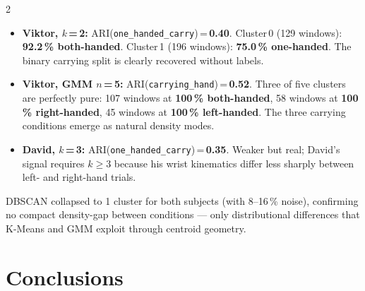 \documentclass[10pt,a4paper]{article}
\begin{document}
\begin{multicols}{2}
\begin{itemize}
  \item \textbf{Viktor, $k$\,=\,2:}
        ARI(\texttt{one\_handed\_carry})\,=\,\textbf{0.40}.
        Cluster\,0 (129 windows): \textbf{92.2\,\% both-handed}.
        Cluster\,1 (196 windows): \textbf{75.0\,\% one-handed}.
        The binary carrying split is clearly recovered without labels.
  \item \textbf{Viktor, GMM $n$\,=\,5:}
        ARI(\texttt{carrying\_hand})\,=\,\textbf{0.52}.
        Three of five clusters are perfectly pure:
        107 windows at \textbf{100\,\% both-handed},
        58 windows at \textbf{100\,\% right-handed},
        45 windows at \textbf{100\,\% left-handed}.
        The three carrying conditions emerge as natural density modes.
  \item \textbf{David, $k$\,=\,3:}
        ARI(\texttt{one\_handed\_carry})\,=\,\textbf{0.35}.
        Weaker but real; David's signal requires $k \geq 3$ because his
        wrist kinematics differ less sharply between left- and right-hand trials.
\end{itemize}

DBSCAN collapsed to 1 cluster for both subjects (with 8--16\,\% noise), confirming
no compact density-gap between conditions --- only distributional differences that
K-Means and GMM exploit through centroid geometry.




\section{Conclusions}


\end{multicols}
\end{document}
